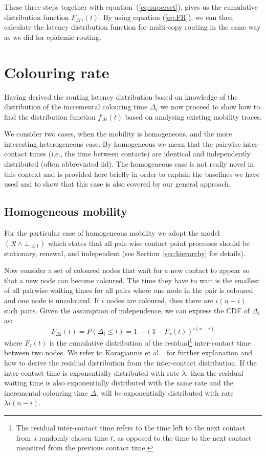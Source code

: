 \documentclass{article}
\begin{document}
These three steps together with equation~(\ref{eq:superset}), gives us
the cumulative distribution function $F_{\Delta' i}(t)$. By using
equation (\ref{eq:FR}), we can then calculate the latency distribution
function for multi-copy routing in the same way as we did for epidemic
routing.

\section{Colouring rate}
\label{sec:colouring}

Having derived the routing latency distribution based on knowledge of
the distribution of the incremental colouring time $\Delta_i$ we now
proceed to show how to find the distribution function $f_{\Delta i}(t)$
based on analysing existing mobility traces.

We consider two cases, when the mobility is homogeneous, and the more
interesting heterogeneous case. By homogeneous we mean that the
pairwise inter-contact times (i.e., the time between contacts) are
identical and independently distributed (often abbreviated iid). The
homogeneous case is not really novel in this context and is provided
here briefly in order to explain the baselines we have used and to
show that this case is also covered by our general approach.

\subsection{Homogeneous mobility}
\label{sec:homogeneous}
 
For the particular case of homogeneous mobility we adopt the model
$(\mathcal{R}\land\bot_{\le1})$ which states that all pair-wise
contact point processes should be stationary, renewal, and independent
(see Section~\ref{sec:hierarchy} for details).

Now consider a set of coloured nodes that wait for a new contact to
appear so that a new node can become coloured. The time they have to
wait is the smallest of all pairwise waiting times for all pairs where
one node in the pair is coloured and one node is uncoloured. If $i$
nodes are coloured, then there are $i(n-i)$ such pairs. Given the 
assumption of independence, we can express the CDF of $\Delta_i$ as:
\begin{equation}
\label{eq:homFi}
F_{\Delta i}(t) = P(\Delta_i  \le t) = 1-(1-F_\tau(t))^{i(n-i)}
\end{equation}
where $F_\tau(t)$ is the cumulative distribution of the
residual\footnote{The residual inter-contact time refers to the time
  left to the next contact from a randomly chosen time $t$, as opposed
  to the time to the next contact measured from the previous contact
  time.} inter-contact time between two nodes. We refer to Karagiannis
et al.~\cite{karagiannis10} for further explanation and how to derive
the residual distribution from the inter-contact distribution. If the
inter-contact time is exponentially distributed with rate $\lambda$,
then the residual waiting time is also exponentially distributed with
the same rate and the incremental colouring time $\Delta_i$ will be
exponentially distributed with rate $\lambda i (n-i)$.
\end{document}

